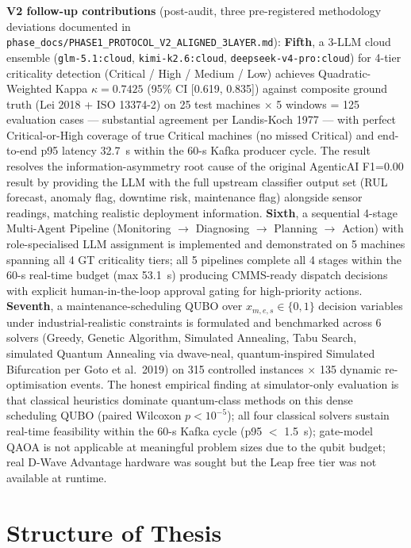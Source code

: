 \textbf{V2 follow-up contributions} (post-audit, three pre-registered methodology deviations documented in \texttt{phase\_docs/PHASE1\_PROTOCOL\_V2\_ALIGNED\_3LAYER.md}):
\textbf{Fifth}, a 3-LLM cloud ensemble (\texttt{glm-5.1:cloud}, \texttt{kimi-k2.6:cloud}, \texttt{deepseek-v4-pro:cloud}) for 4-tier criticality detection (Critical / High / Medium / Low) achieves Quadratic-Weighted Kappa $\kappa = 0.7425$ (95\% CI [0.619, 0.835]) against composite ground truth (Lei 2018 + ISO 13374-2) on 25 test machines $\times$ 5 windows = 125 evaluation cases --- substantial agreement per Landis-Koch 1977 --- with perfect Critical-or-High coverage of true Critical machines (no missed Critical) and end-to-end p95 latency 32.7~s within the 60-s Kafka producer cycle. The result resolves the information-asymmetry root cause of the original AgenticAI F1=0.00 result by providing the LLM with the full upstream classifier output set (RUL forecast, anomaly flag, downtime risk, maintenance flag) alongside sensor readings, matching realistic deployment information.
\textbf{Sixth}, a sequential 4-stage Multi-Agent Pipeline (Monitoring $\to$ Diagnosing $\to$ Planning $\to$ Action) with role-specialised LLM assignment is implemented and demonstrated on 5 machines spanning all 4 GT criticality tiers; all 5 pipelines complete all 4 stages within the 60-s real-time budget (max 53.1~s) producing CMMS-ready dispatch decisions with explicit human-in-the-loop approval gating for high-priority actions.
\textbf{Seventh}, a maintenance-scheduling QUBO over $x_{m,e,s} \in \{0,1\}$ decision variables under industrial-realistic constraints is formulated and benchmarked across 6 solvers (Greedy, Genetic Algorithm, Simulated Annealing, Tabu Search, simulated Quantum Annealing via dwave-neal, quantum-inspired Simulated Bifurcation per Goto et al.\ 2019) on 315 controlled instances $\times$ 135 dynamic re-optimisation events. The honest empirical finding at simulator-only evaluation is that classical heuristics dominate quantum-class methods on this dense scheduling QUBO (paired Wilcoxon $p < 10^{-5}$); all four classical solvers sustain real-time feasibility within the 60-s Kafka cycle (p95 $<$ 1.5~s); gate-model QAOA is not applicable at meaningful problem sizes due to the qubit budget; real D-Wave Advantage hardware was sought but the Leap free tier was not available at runtime.

\section{Structure of Thesis}

